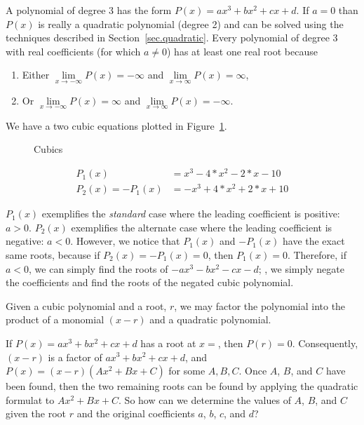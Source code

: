 A polynomial of degree 3 has the form $P(x) = a x^3 + b x^2 + c x +d$.
If $a=0$ than $P(x)$ is really a quadratic polynomial (degree 2)
and can be solved using the techniques described in
Section~\ref{sec.quadratic}.  Every polynomial of degree 3 with real
coefficients (for which $a\neq 0$) has at least one real root because
\begin{enumerate}
\item Either $\lim\limits_{x\to-\infty}P(x) = -\infty$ and $\lim\limits_{x\to\infty}P(x) = \infty$,
  \item Or $\lim\limits_{x\to-\infty}P(x) = \infty$ and $\lim\limits_{x\to\infty}P(x) = -\infty$.
\end{enumerate}


We have a two cubic equations plotted in Figure~\ref{fig.cubic}.

\begin{figure}
  \centering

  \caption{Cubics}
  \label{fig.cubic}
\end{figure}

\begin{align*}
  P_1(x) &= x^3 - 4*x^2 - 2*x - 10\\
  P_2(x) = -P_1(x) &= -x^3 + 4*x^2 + 2*x + 10
\end{align*}

$P_1(x)$ exemplifies the \emph{standard} case where the leading coefficient is positive: $a>0$.
$P_2(x)$ exemplifies the alternate case where the leading coefficient is negative: $a<0$.
However, we notice that $P_1(x)$ and $-P_1(x)$ have the exact same roots, because if $P_2(x) = -P_1(x) = 0$,
then $P_1(x) = 0$.  Therefore, if $a<0$, we can simply find the roots of $-a x^3 -b x^2 - c x - d$;
\ie, we simply negate the coefficients and find the roots of the negated cubic polynomial.




Given a cubic polynomial and a root, $r$, we may factor the polynomial into
the product of a monomial $(x-r)$ and a quadratic polynomial.

If $P(x) = a x^3 + b x^2 + c x + d$ has a root at $x=$, then $P(r)=0$.
Consequently, $(x-r)$ is a factor of $a x^3 + b x^2 + c x + d$, and
$P(x) = (x-r)(A x^2 + B x + C)$ for some $A, B, C$.  Once $A$, $B$,
and $C$ have been found, then the two remaining roots can be found by
applying the quadratic formulat to $A x^2 + B x + C$.  So how can we
determine the values of $A$, $B$, and $C$ given the root $r$ and the
original coefficients $a$, $b$, $c$, and $d$?

